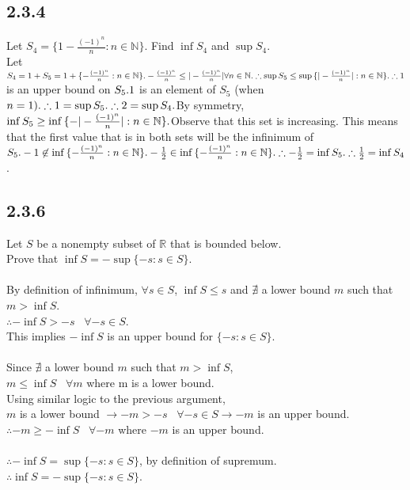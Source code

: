 \documentclass{article}
\begin{document}
\subsection{2.3.4}
Let $S_4 = \{1-\frac{(-1)^n}{n}: n \in \mathbb{N}\}$. Find $\inf{S_4}$ and
$\sup{S_4}$.
\\Let $S_4 = 1+S_5 = 1+\{-\frac{(-1)^n}{n}: n \in \mathbb{N}\}.
\\-\frac{(-1)^n}{n} \le |-\frac{(-1)^n}{n}| \forall n \in \mathbb{N}.
\\\therefore \sup{S_5} \le \sup{\{|-\frac{(-1)^n}{n}|: n \in \mathbb{N}\}}.
\\\therefore 1$ is an upper bound on $S_5.
\\1$ is an element of $S_5$ (when $n=1).
\\\therefore 1 = \sup{S_5}.
\\\therefore 2 = \sup{S_4}.
\\
\\$By symmetry, $\inf{S_5} \ge
\inf{\{-|-\frac{(-1)^n}{n}|: n \in \mathbb{N}\}}.
\\$Observe that this set is increasing. This means that the first value that
is in both sets will be the infinimum of $S_5.
\\-1 \not\in \inf{\{-\frac{(-1)^n}{n}: n \in \mathbb{N}\}}.
\\-\frac{1}{2} \in \inf{\{-\frac{(-1)^n}{n}: n \in \mathbb{N}\}}.
\\\therefore -\frac{1}{2} = \inf{S_5}.
\\\therefore \frac{1}{2} = \inf{S_4}$.

\subsection{2.3.6}
Let $S$ be a nonempty subset of $\mathbb{R}$ that is bounded below.
\\Prove that $\inf{S} = -\sup{\{-s: s \in S\}}$.
\\
\\By definition of infinimum, $\forall s \in S$, $\inf{S} \le s$ and
$\nexists$ a lower bound $m$ such that $m > \inf{S}$.
\\$\therefore -\inf{S} > -s \;\;\; \forall {-s} \in S$.
\\This implies $-\inf{S}$ is an upper bound for $\{-s: s \in S\}$.
\\
\\Since $\nexists$ a lower bound $m$ such that $m > \inf{S}$,
\\$m \le \inf{S} \;\;\; \forall m$ where m is a lower bound.
\\Using similar logic to the previous argument,
\\$m$ is a lower bound $\rightarrow -m > -s \;\;\; \forall {-s} \in S
\rightarrow -m$ is an upper bound.
\\$\therefore -m \ge -\inf{S} \;\;\; \forall -m$ where $-m$ is an upper
bound.
\\
\\$\therefore -\inf{S} = \sup{\{-s: s \in S\}}$, by definition of supremum.
\\$\therefore \inf{S} = -\sup{\{-s: s \in S\}}$.
\end{document}
